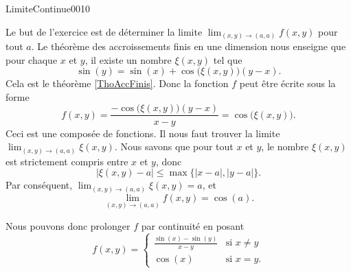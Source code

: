 \begin{corrige}{LimiteContinue0010}


Le but de l'exercice est de déterminer la limite $\lim_{(x,y)\to(a,a)}f(x,y)$ pour tout $a$. Le théorème des accroissements finis en une dimension nous enseigne que pour chaque $x$ et $y$, il existe un nombre $\xi(x,y)$ tel que
\begin{equation}
	\sin(y)=\sin(x)+\cos\big( \xi(x,y) \big)(y-x).
\end{equation}
Cela est le théorème \ref{ThoAccFinis}. Donc la fonction $f$ peut être écrite sous la forme
\begin{equation}
	f(x,y)=\frac{ -\cos\big( \xi(x,y) \big)(y-x) }{ x-y }=\cos\big( \xi(x,y) \big).
\end{equation}
Ceci est une composée de fonctions. Il nous faut trouver la limite $\lim_{(x,y)\to(a,a)}\xi(x,y)$. Nous savons que pour tout $x$ et $y$, le nombre $\xi(x,y)$ est strictement compris entre $x$ et $y$, donc
\begin{equation}
	\big| \xi(x,y)-a \big|\leq\max\big\{ | x-a |,| y-a | \big\}.
\end{equation}
Par conséquent, $\lim_{(x,y)\to(a,a)}\xi(x,y)=a$, et
\begin{equation}
	\lim_{(x,y)\to(a,a)}f(x,y)=\cos(a).
\end{equation}

Nous pouvons donc prolonger $f$ par continuité en posant
\begin{equation}
	f(x,y)=\begin{cases}
		\displaystyle\frac{ \sin(x)-\sin(y) }{ x-y }	&	\text{si $x\neq y$}\\
		\cos(x)	&	 \text{si $x=y$.}
	\end{cases}
\end{equation}

\end{corrige}
